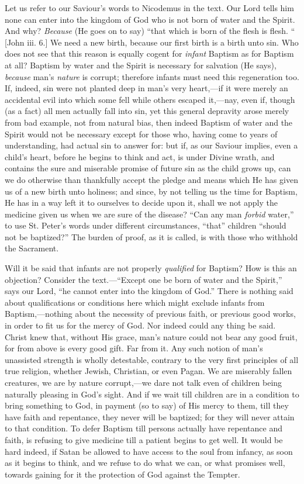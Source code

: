 Let us refer to our Saviour's words to Nicodemus in
the text. Our Lord tells him none can enter into the
kingdom of God who is not born of water and the Spirit. And why? \emph{Because} (He goes on to say) ``that
which is born of the flesh is flesh. `` [John iii.
6.] We need a new birth, because our first birth is a
birth unto sin. Who does not see that this reason is
equally cogent for \emph{infant} Baptism as for Baptism
at all? Baptism by water and the Spirit is necessary for
salvation (He says), \emph{because} man's \emph{nature}
is corrupt; therefore infants must need this regeneration
too. If, indeed, sin were not planted deep in man's very
heart,—if it were merely an accidental evil into
which some fell while others escaped it,—nay, even
if, though (as a fact) all men actually fall into sin, yet
this general depravity arose merely from bad example, not
from natural bias, then indeed Baptism of water and the
Spirit would not be necessary except for those who,
having come to years of understanding, had actual sin to
answer for: but if, as our Saviour implies, even a child's
heart, before he begins to think and act, is under Divine
wrath, and contains the sure and miserable promise of
future sin as the child grows up, can we do otherwise
than thankfully accept the pledge and means which He has
given us of a new birth unto holiness; and since, by not
telling us the time for Baptism, He has in a way left it
to ourselves to decide upon it, shall we not apply the
medicine given us when we are sure of the disease?
``Can any man \emph{forbid} water,'' to use St.
Peter's words under different circumstances,
``that'' children ``should not be
baptized?'' The burden of proof, as it is called, is
with those who withhold the Sacrament.

Will it be said that infants are not properly \emph{qualified}
for Baptism? How is this an objection? Consider the
text.—``Except one be born of water and the
Spirit,'' says our Lord, ``he cannot enter into
the kingdom of God.'' There is nothing said about
qualifications or conditions here which might exclude
infants from Baptism,—nothing about the necessity of
previous faith, or previous good works, in order to fit
us for the mercy of God. Nor indeed could any thing be
said. Christ knew that, without His grace, man's nature
could not bear any good fruit, for from above is every
good gift. Far from it. Any such notion of man's
unassisted strength is wholly detestable, contrary to the
very first principles of all true religion, whether
Jewish, Christian, or even Pagan. We are miserably fallen
creatures, we are by nature corrupt,—we dare not
talk even of children being naturally pleasing in God's
sight. And if we wait till children are in a condition to
bring something to God, in payment (so to say) of His
mercy to them, till they have faith and repentance, they
never will be baptized; for they will never attain to
that condition. To defer Baptism till persons actually
have repentance and faith, is refusing to give medicine
till a patient begins to get well. It would be hard
indeed, if Satan be allowed to have access to the soul
from infancy, as soon as it begins to think, and we
refuse to do what we can, or what promises well, towards
gaining for it the protection of God against the Tempter.

